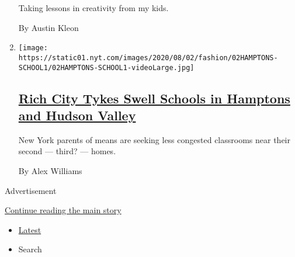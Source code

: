 \begin{enumerate}
  Taking lessons in creativity from my kids.

  By Austin Kleon
\item
  \texttt{[image: https://static01.nyt.com/images/2020/08/02/fashion/02HAMPTONS-SCHOOL1/02HAMPTONS-SCHOOL1-videoLarge.jpg]}

  \hypertarget{rich-city-tykes-swell-schools-in-hamptons-and-hudson-valley}{%
  \subsection{\texorpdfstring{\href{/2020/08/01/style/wealthy-rich-parents-coronavirus-schools-hamptons.html}{Rich
  City Tykes Swell Schools in Hamptons and Hudson
  Valley}}{Rich City Tykes Swell Schools in Hamptons and Hudson Valley}}\label{rich-city-tykes-swell-schools-in-hamptons-and-hudson-valley}}

  New York parents of means are seeking less congested classrooms near
  their second --- third? --- homes.

  By Alex Williams
\end{enumerate}

Advertisement

\protect\hyperlink{after-mid1}{Continue reading the main story}

\begin{itemize}
\tightlist
\item
  \protect\hyperlink{stream-panel}{Latest}
\item
  Search
\end{itemize}

